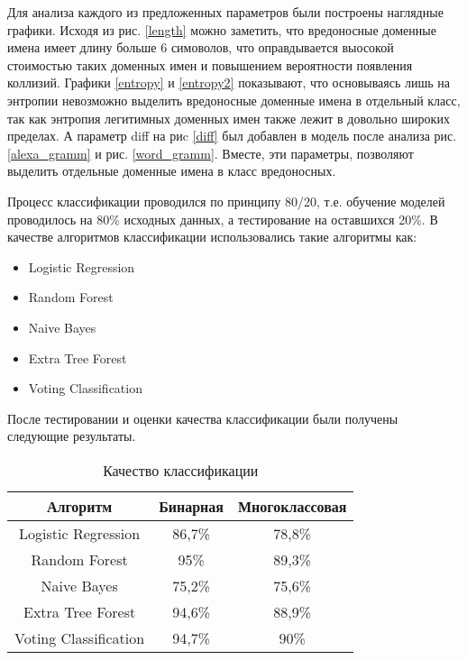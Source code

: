     Для анализа каждого из предложенных параметров были построены наглядные графики.
    Исходя из рис. \ref{length} можно заметить, что вредоносные доменные имена имеет длину больше 6 симоволов, что оправдывается выосокой стоимостью таких доменных имен и повышением вероятности появления коллизий.
    Графики \ref{entropy} и \ref{entropy2} показывают, что основываясь лишь на энтропии невозможно выделить вредоносные доменные имена в отдельный класс, так как энтропия легитимных доменных имен также лежит в довольно широких пределах. А параметр diff на риc \ref{diff} был добавлен в модель после анализа рис. \ref{alexa_gramm} и рис. \ref{word_gramm}. Вместе, эти параметры, позволяют выделить отдельные доменные имена в класс вредоносных.

    Процесс классификации проводился по принципу 80/20, т.е. обучение моделей проводилось на 80\% исходных данных, а тестирование  на оставшихся 20\%. В качестве алгоритмов классификации использовались такие алгоритмы как:
    \begin{itemize}
    \item Logistic Regression
    \item Random Forest
    \item Naive Bayes
    \item Extra Tree Forest
    \item Voting Classification
    \end{itemize}

    После тестировании и оценки качества классификации были получены следующие результаты.
    \begin{table}[ht]
    \centering
    \caption{Качество классификации}\label{}
    \begin{tabular}{@{}ccc@{}}
    \toprule
    Алгоритм              & Бинарная & Многоклассовая \\ \midrule
    Logistic Regression   & 86,7\%   & 78,8\%         \\
    Random Forest         & 95\%     & 89,3\%         \\
    Naive Bayes           & 75,2\%   & 75,6\%         \\
    Extra Tree Forest     & 94,6\%   & 88,9\%         \\
    Voting Classification & 94,7\%   & 90\%           \\ \bottomrule
    \end{tabular}
    \end{table}

